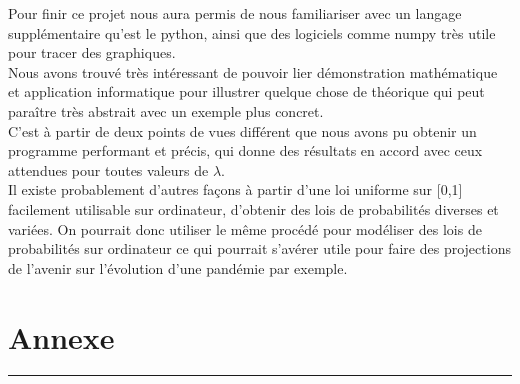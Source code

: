 \documentclass[12,french]{report}
\begin{document}
Pour finir ce projet nous aura permis de nous familiariser avec un langage supplémentaire qu'est le python, ainsi que des logiciels comme numpy très utile pour tracer des graphiques.\\

Nous avons trouvé très intéressant de pouvoir lier démonstration mathématique et application informatique pour illustrer quelque chose de théorique qui peut paraître très abstrait avec un exemple plus concret.\\

C'est à partir de deux points de vues différent que nous avons pu obtenir un programme performant et précis, qui donne des résultats en accord avec ceux attendues pour toutes valeurs de $\lambda$.\\
Il existe probablement d'autres façons à partir d'une loi uniforme sur [0,1] facilement utilisable sur ordinateur, d'obtenir des lois de probabilités diverses et variées. On pourrait donc utiliser le même procédé pour modéliser des lois de probabilités sur ordinateur ce qui pourrait s'avérer utile pour faire des projections de l'avenir sur l'évolution d'une pandémie par exemple. 



\chapter*{Annexe}

\hrule
\begin{lstlisting}[caption=Programme en Python]
	
\end{lstlisting}


\end{document}
